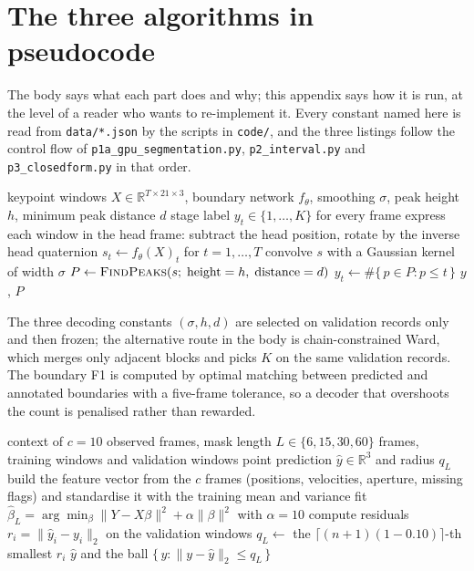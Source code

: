 \section{The three algorithms in pseudocode}
\label{app:algorithms}

The body says what each part does and why; this appendix says how it is run, at the level of a
reader who wants to re-implement it. Every constant named here is read from \texttt{data/*.json}
by the scripts in \texttt{code/}, and the three listings follow the control flow of
\texttt{p1a\_gpu\_segmentation.py}, \texttt{p2\_interval.py} and \texttt{p3\_closedform.py} in
that order.

\begin{algorithm}[H]
\caption{Boundary decoding: from per-frame scores to stage labels (Part I)}
\label{alg:p1}
\begin{algorithmic}[1]
\Require keypoint windows $X\in\mathbb{R}^{T\times 21\times 3}$, boundary network $f_\theta$,
smoothing $\sigma$, peak height $h$, minimum peak distance $d$
\Ensure stage label $y_t\in\{1,\dots,K\}$ for every frame
\State express each window in the head frame: subtract the head position, rotate by the
inverse head quaternion
\State $s_t \gets f_\theta(X)_t$ for $t=1,\dots,T$ 
\State convolve $s$ with a Gaussian kernel of width $\sigma$
\State $P \gets \textsc{FindPeaks}(s;\;\text{height}=h,\;\text{distance}=d)$
\State $y_t \gets \#\{\,p\in P : p\le t\,\}$ 
\State \Return $y$, $P$
\end{algorithmic}
\end{algorithm}

The three decoding constants $(\sigma,h,d)$ are selected on validation records only and then
frozen; the alternative route in the body is chain-constrained Ward, which merges only adjacent
blocks and picks $K$ on the same validation records. The boundary F1 is computed by optimal
matching between predicted and annotated boundaries with a five-frame tolerance, so a decoder
that overshoots the count is penalised rather than rewarded.

\begin{algorithm}[H]
\caption{Ridge prediction and split-conformal radius (Part II)}
\label{alg:p2}
\begin{algorithmic}[1]
\Require context of $c=10$ observed frames, mask length $L\in\{6,15,30,60\}$ frames, training
windows and validation windows
\Ensure point prediction $\hat{y}\in\mathbb{R}^{3}$ and radius $q_L$
\State build the feature vector from the $c$ frames (positions, velocities, aperture, missing
flags) and standardise it with the training mean and variance
\State fit $\hat{\beta}_L=\arg\min_{\beta}\|Y-X\beta\|^{2}+\alpha\|\beta\|^{2}$ with
$\alpha=10$ 
\State compute residuals $r_i=\|\hat{y}_i-y_i\|_{2}$ on the validation windows
\State $q_L\gets$ the $\lceil (n+1)(1-0.10)\rceil$-th smallest $r_i$
\State \Return $\hat{y}$ and the ball $\{\,y:\|y-\hat{y}\|_2\le q_L\,\}$
\end{algorithmic}
\end{algorithm}

